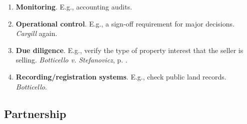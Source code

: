 \begin{enumerate}
\begin{enumerate}
        \item \textbf{Monitoring}. E.g., accounting audits.
        \item \textbf{Operational control}. E.g., a sign-off requirement for 
        major decisions. \emph{Cargill} again.
        \item \textbf{Due diligence}. E.g., verify the type of property 
        interest that the seller is selling. \emph{Botticello v. Stefanovicz}, 
        p. \pageref{par:botticello}.
        \item \textbf{Recording/registration systems}. E.g., check public land 
        records. \emph{Botticello}.
    \end{enumerate}
    
\end{enumerate}

\newpage

\subsection{Partnership}

